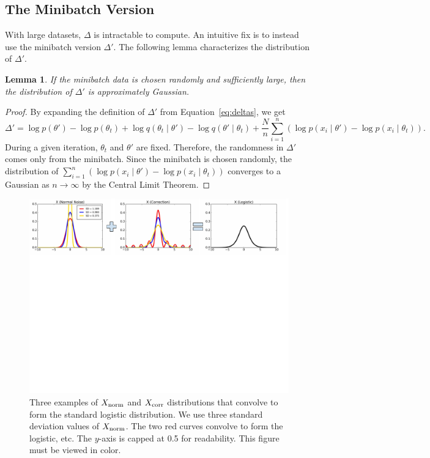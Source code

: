 \documentclass{article}
\newtheorem{lemma}{Lemma}
\begin{document}
\subsection{The Minibatch Version}\label{ssec:deltas_minibatch}

With large datasets, $\Delta$ is intractable to compute. An intuitive fix is to instead use the
minibatch version $\Delta'$. The following lemma characterizes the distribution of $\Delta'$.

\begin{lemma}\label{lem:gaussian}
If the minibatch data is chosen randomly and sufficiently large, then the distribution of $\Delta'$ is approximately Gaussian.
\end{lemma}

\begin{proof}
By expanding the definition of $\Delta'$ from Equation~\ref{eq:deltas}, we get
\[
\Delta' = \log p(\theta') - \log p(\theta_t) + \log q(\theta_t \mid \theta') - \log q(\theta' \mid \theta_t) +
\frac{N}{n}\sum_{i=1}^n (\log p(x_i\mid \theta') - \log p(x_i\mid \theta_t)).
\]
During a given iteration, $\theta_t$ and $\theta'$ are fixed. Therefore, the randomness in $\Delta'$
comes only from the minibatch. Since the minibatch is chosen randomly, the distribution of
$\sum_{i=1}^n (\log p(x_i\mid \theta') - \log p(x_i\mid \theta_t))$ converges to a Gaussian as $n
\to \infty$ by the Central Limit Theorem.
\end{proof}

\begin{figure}[t]
    \centering
    \includegraphics[width=1\textwidth]{mh_convolution_diagram_v2}
    \caption{
    Three examples of $X_{\rm norm}$ and $X_{\rm corr}$ distributions that convolve to form the
    standard logistic distribution. We use three standard deviation values of $X_{\rm norm}$. The
    two red curves convolve to form the logistic, etc. The $y$-axis is capped at 0.5 for
    readability. This figure must be viewed in color.
    }
    \label{fig:deconvolution}
\end{figure}
\end{document}
